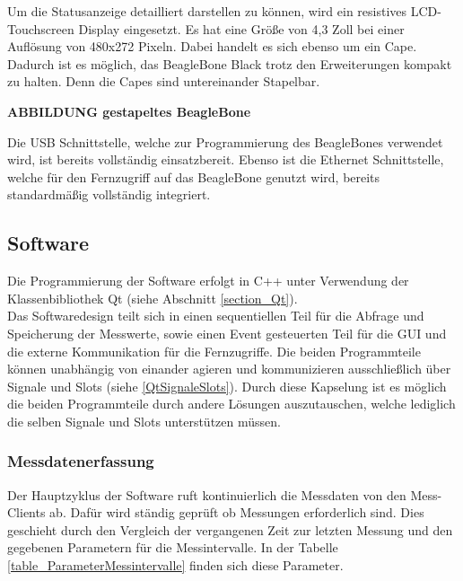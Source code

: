 Um die Statusanzeige detailliert darstellen zu können, wird ein resistives LCD-Touchscreen Display eingesetzt. Es hat eine Größe von 4,3 Zoll bei einer Auflösung von 480x272 Pixeln. Dabei handelt es sich ebenso um ein Cape. Dadurch ist es möglich, das BeagleBone Black trotz den Erweiterungen kompakt zu halten. Denn die Capes sind untereinander Stapelbar.\ 


\textbf{ABBILDUNG gestapeltes BeagleBone}


Die USB Schnittstelle, welche zur Programmierung des BeagleBones verwendet wird, ist bereits vollständig einsatzbereit. Ebenso ist die Ethernet Schnittstelle, welche für den Fernzugriff auf das BeagleBone genutzt wird, bereits standardmäßig vollständig integriert.

\subsection{Software}
\label{ServerSoftware}
Die Programmierung der Software erfolgt in C++ unter Verwendung der Klassenbibliothek Qt (siehe Abschnitt \ref{section_Qt}).\\
Das Softwaredesign teilt sich in einen sequentiellen Teil für die Abfrage und Speicherung der Messwerte, sowie einen Event gesteuerten Teil für die \ac{GUI} und die externe Kommunikation für die Fernzugriffe. Die beiden Programmteile können unabhängig von einander agieren und kommunizieren ausschließlich über Signale und Slots (siehe \ref{QtSignaleSlots}). Durch diese Kapselung ist es möglich die beiden Programmteile durch andere Lösungen auszutauschen, welche lediglich die selben Signale und Slots unterstützen müssen.\ 

\subsubsection{Messdatenerfassung}
Der Hauptzyklus der Software ruft kontinuierlich die Messdaten von den Mess-Clients ab. Dafür wird ständig geprüft ob Messungen erforderlich sind. Dies geschieht durch den Vergleich der vergangenen Zeit zur letzten Messung und den gegebenen Parametern für die Messintervalle. In der Tabelle \ref{table_ParameterMessintervalle} finden sich diese Parameter.\\


